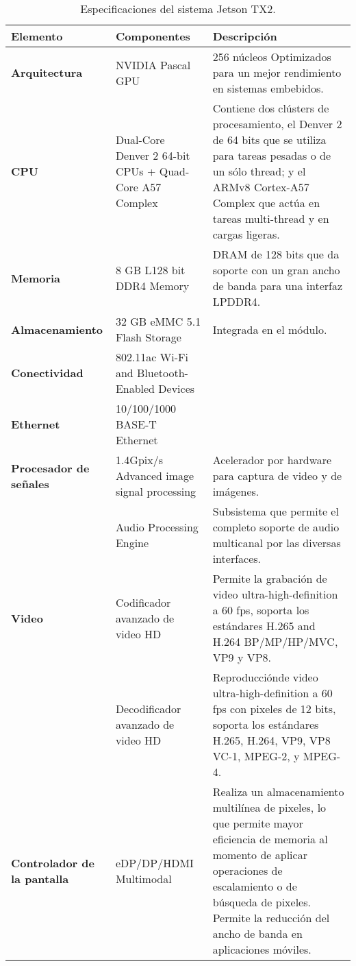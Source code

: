     \begin{table}[h!]
      \begin{center}
            \small
        \begin{tabular}{|m{3cm}|m{5.5cm}|m{6.5cm}|}
         \hline
        \cellcolor{lightgray}\textbf{Elemento} & \cellcolor{lightgray} \textbf{Componentes} & \cellcolor{lightgray} \textbf{Descripción}\\ 
         \hline
         \textbf{Arquitectura} & NVIDIA Pascal GPU & 256 núcleos Optimizados para un mejor rendimiento en sistemas embebidos.\\
         \hline
         \textbf{CPU} & Dual-Core Denver 2 64-bit CPUs + Quad-Core A57 Complex & Contiene dos clústers de procesamiento, el Denver 2 de 64 bits que se utiliza para tareas pesadas o de un sólo thread; y el ARMv8 Cortex-A57 Complex que actúa en tareas multi-thread y en cargas ligeras.\\
         \hline
         \textbf{Memoria} & 8 GB L128 bit DDR4 Memory & DRAM de 128 bits que da soporte con un gran ancho de banda para una interfaz LPDDR4.  \\
          \hline
    	\textbf{Almacenamiento} & 32 GB eMMC 5.1 Flash Storage & Integrada en el módulo.\\
         \hline
    	\textbf{Conectividad} & 802.11ac Wi-Fi and Bluetooth-Enabled Devices & \\
         \hline
   	 \textbf{Ethernet} &10/100/1000 BASE-T Ethernet & \\
	  \hline
   	 \textbf{Procesador de señales} &1.4Gpix/s Advanced image signal processing & Acelerador por hardware para captura de video y de imágenes.\\
	 &Audio Processing Engine & Subsistema que permite el completo soporte de audio multicanal por las diversas interfaces.\\
	 \hline
   	 \textbf{Video} & Codificador avanzado de video HD & Permite la grabación de video ultra-high-definition a 60 fps, soporta los estándares H.265 and H.264 BP/MP/HP/MVC, VP9 y VP8. \\
	  & Decodificador avanzado de video HD & Reproducciónde video ultra-high-definition a 60 fps con pixeles de 12 bits, soporta los estándares H.265, H.264, VP9, VP8 VC-1, MPEG-2, y MPEG-4. \\
         \hline
   	 \textbf{Controlador de la pantalla} &eDP/DP/HDMI Multimodal & Realiza un almacenamiento multilínea de pixeles, lo que permite mayor eficiencia de memoria al momento de aplicar operaciones de escalamiento o de búsqueda de pixeles. Permite la reducción del ancho de banda en aplicaciones móviles.\\
         \hline
        \end{tabular}
        \caption{Especificaciones del sistema Jetson TX2\cite{jtx2dk}.}
        \label{tab:jetson}
      \end{center}
    \end{table}
       
